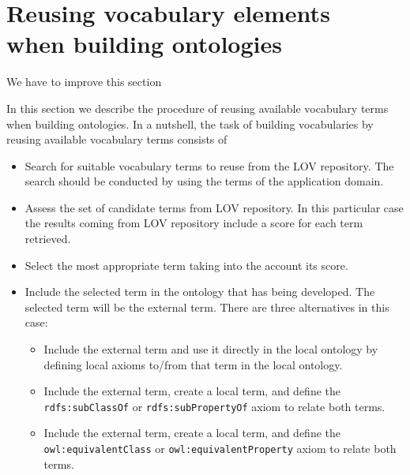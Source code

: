 

\section{Reusing vocabulary elements\\ when building ontologies}\label{sec:reuse}

We have to improve this section 

In this section we describe the procedure of reusing available vocabulary terms when building ontologies. In a nutshell, the task of building vocabularies by reusing available vocabulary terms consists of

\begin{itemize}
	\item Search for suitable vocabulary terms to reuse from the LOV repository. The search should be conducted by using the terms of the application domain.
	\item Assess the set of candidate terms from LOV repository. In this particular case the results coming from LOV repository include a score for each term retrieved.
	\item Select the most appropriate term taking into the account its score.
	\item Include the selected term in the ontology that has being developed. The selected term will be the external term. There are three alternatives in this case: 
	\begin{itemize}
		\item Include the external term and use it directly in the local ontology by defining local axioms to/from that term in the local ontology.
		\item Include the external term, create a local term, and define the {\tt rdfs:subClassOf} or {\tt rdfs:subPropertyOf} axiom to relate both terms.
		\item Include the external term, create a local term, and define the {\tt owl:equivalentClass} or {\tt owl:equivalentProperty} axiom to relate both terms. 				
	\end{itemize}
\end{itemize}

